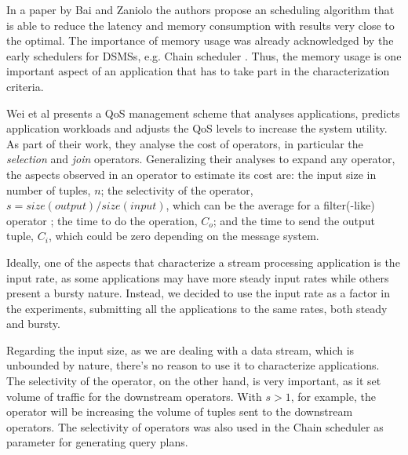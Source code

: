 \documentclass[ppgc,diss,english]{iiufrgs}
\begin{document}
In a paper by Bai and Zaniolo \cite{bai2008minimizing} the authors propose an scheduling algorithm that is able to reduce the latency and memory consumption with results very close to the optimal. The importance of memory usage was already acknowledged by the early schedulers for DSMSs, e.g. Chain scheduler \cite{babcock2003chain}. Thus, the memory usage is one important aspect of an application that has to take part in the characterization criteria.

Wei et al \cite{wei2006prediction} presents a QoS management scheme that analyses applications, predicts application workloads and adjusts the QoS levels to increase the system utility. As part of their work, they analyse the cost of operators, in particular the \emph{selection} and \emph{join} operators. Generalizing their analyses to expand any operator, the aspects observed in an operator to estimate its cost are: the input size in number of tuples, $n$; the selectivity of the operator, $s = size(output)/size(input)$, which can be the average for a filter(-like) operator \cite{babcock2004operator}; the time to do the operation, $C_{o}$; and the time to send the output tuple, $C_{i}$, which could be zero depending on the message system.

Ideally, one of the aspects that characterize a stream processing application is the input rate, as some applications may have more steady input rates while others present a bursty nature. Instead, we decided to use the input rate as a factor in the experiments, submitting all the applications to the same rates, both steady and bursty.

Regarding the input size, as we are dealing with a data stream, which is unbounded by nature, there's no reason to use it to characterize applications. The selectivity of the operator, on the other hand, is very important, as it set volume of traffic for the downstream operators. With $s > 1$, for example, the operator will be increasing the volume of tuples sent to the downstream operators. The selectivity of operators was also used in the Chain scheduler \cite{babcock2003chain} as parameter for generating query plans.


\end{document}
